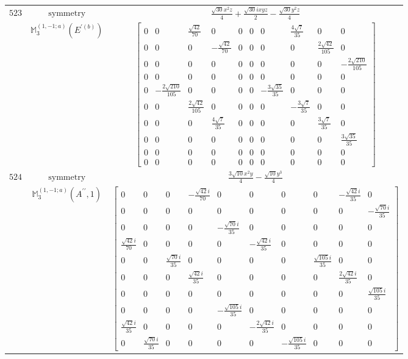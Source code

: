 \documentclass[fleqn,8pt,landscape]{jsarticle}
\begin{document}
\begin{longtable}{ccc}
$ 523 $ & $ \text{symmetry} $ & $ \frac{\sqrt{30} x^{2} z}{4} + \frac{\sqrt{30} i x y z}{2} - \frac{\sqrt{30} y^{2} z}{4} $ \\
$  $ & $ \mathbb{M}_{3}^{(1,-1;a)}(E^{\prime(b)}) $ & $ \begin{bmatrix} 0 & 0 & \frac{\sqrt{42}}{70} & 0 & 0 & 0 & 0 & \frac{4 \sqrt{7}}{35} & 0 & 0 \\ 0 & 0 & 0 & - \frac{\sqrt{42}}{70} & 0 & 0 & 0 & 0 & \frac{2 \sqrt{42}}{105} & 0 \\ 0 & 0 & 0 & 0 & 0 & 0 & 0 & 0 & 0 & - \frac{2 \sqrt{210}}{105} \\ 0 & 0 & 0 & 0 & 0 & 0 & 0 & 0 & 0 & 0 \\ 0 & - \frac{2 \sqrt{210}}{105} & 0 & 0 & 0 & 0 & - \frac{3 \sqrt{35}}{35} & 0 & 0 & 0 \\ 0 & 0 & \frac{2 \sqrt{42}}{105} & 0 & 0 & 0 & 0 & - \frac{3 \sqrt{7}}{35} & 0 & 0 \\ 0 & 0 & 0 & \frac{4 \sqrt{7}}{35} & 0 & 0 & 0 & 0 & \frac{3 \sqrt{7}}{35} & 0 \\ 0 & 0 & 0 & 0 & 0 & 0 & 0 & 0 & 0 & \frac{3 \sqrt{35}}{35} \\ 0 & 0 & 0 & 0 & 0 & 0 & 0 & 0 & 0 & 0 \\ 0 & 0 & 0 & 0 & 0 & 0 & 0 & 0 & 0 & 0 \end{bmatrix} $ \\ \hline
$ 524 $ & $ \text{symmetry} $ & $ \frac{3 \sqrt{10} x^{2} y}{4} - \frac{\sqrt{10} y^{3}}{4} $ \\
$  $ & $ \mathbb{M}_{3}^{(1,-1;a)}(A^{\prime\prime},1) $ & $ \begin{bmatrix} 0 & 0 & 0 & - \frac{\sqrt{42} i}{70} & 0 & 0 & 0 & 0 & - \frac{\sqrt{42} i}{35} & 0 \\ 0 & 0 & 0 & 0 & 0 & 0 & 0 & 0 & 0 & - \frac{\sqrt{70} i}{35} \\ 0 & 0 & 0 & 0 & - \frac{\sqrt{70} i}{35} & 0 & 0 & 0 & 0 & 0 \\ \frac{\sqrt{42} i}{70} & 0 & 0 & 0 & 0 & - \frac{\sqrt{42} i}{35} & 0 & 0 & 0 & 0 \\ 0 & 0 & \frac{\sqrt{70} i}{35} & 0 & 0 & 0 & 0 & \frac{\sqrt{105} i}{35} & 0 & 0 \\ 0 & 0 & 0 & \frac{\sqrt{42} i}{35} & 0 & 0 & 0 & 0 & \frac{2 \sqrt{42} i}{35} & 0 \\ 0 & 0 & 0 & 0 & 0 & 0 & 0 & 0 & 0 & \frac{\sqrt{105} i}{35} \\ 0 & 0 & 0 & 0 & - \frac{\sqrt{105} i}{35} & 0 & 0 & 0 & 0 & 0 \\ \frac{\sqrt{42} i}{35} & 0 & 0 & 0 & 0 & - \frac{2 \sqrt{42} i}{35} & 0 & 0 & 0 & 0 \\ 0 & \frac{\sqrt{70} i}{35} & 0 & 0 & 0 & 0 & - \frac{\sqrt{105} i}{35} & 0 & 0 & 0 \end{bmatrix} $ \\ \hline

\end{longtable}
\end{document}
